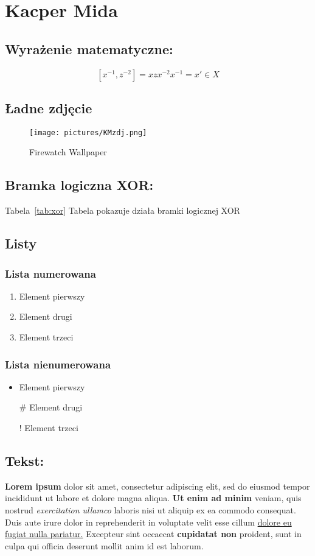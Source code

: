 \section{Kacper Mida}
\subsection{Wyrażenie matematyczne:}
\[ [x^{-1},z^{-2}]=xzx^{-2}x^{-1}=x'\in X\] 
\subsection{Ładne zdjęcie}
\begin{figure}[htbp] 
    \centering
    \texttt{[image: pictures/KMzdj.png]}
    \caption{Firewatch Wallpaper}
    \label{fig:landscape}
\end{figure}


\subsection{Bramka logiczna XOR:}
Tabela~\ref{tab:xor} Tabela pokazuje działa bramki logicznej XOR
    
\subsection{Listy}


\subsubsection{Lista numerowana}
\begin{enumerate}
  \item Element pierwszy
  \item Element drugi
  \item Element trzeci
\end{enumerate}

\subsubsection{Lista nienumerowana}
\begin{itemize}
  \item Element pierwszy
  \item[\#] Element drugi
  \item[!] Element trzeci
\end{itemize}


\subsection{Tekst:}
\textbf{Lorem ipsum} dolor sit amet, consectetur adipiscing elit, sed do eiusmod tempor incididunt ut labore et dolore magna aliqua. \textbf{Ut enim ad minim} veniam, quis nostrud \textit{exercitation ullamco} laboris nisi ut aliquip ex ea commodo consequat. Duis aute irure dolor in reprehenderit in voluptate velit esse cillum  \underline{dolore eu fugiat nulla pariatur.} Excepteur sint occaecat \textbf{cupidatat non} proident, sunt in culpa qui officia deserunt mollit anim id est laborum.